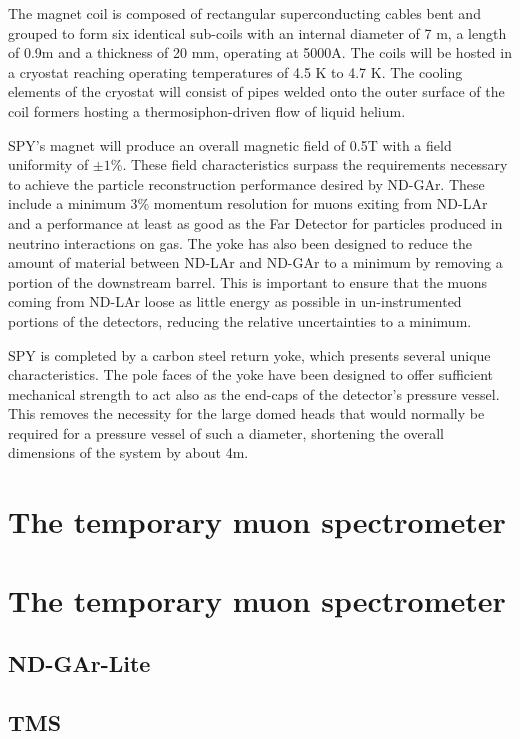 The magnet coil is composed of rectangular superconducting cables bent and grouped to form six identical sub-coils with an internal diameter of 7 m, a length of 0.9m and a thickness of 20 mm, operating at 5000A. The coils will be hosted in a cryostat reaching operating temperatures of 4.5 K to 4.7 K. The cooling elements of the cryostat will consist of pipes welded onto the outer surface of the coil formers hosting a thermosiphon-driven flow of liquid helium. 

SPY's magnet will produce an overall magnetic field of 0.5T with a field uniformity of $\pm 1\%$. These field characteristics surpass the requirements necessary to achieve the particle reconstruction performance desired by ND-GAr. These include a minimum 3\% momentum resolution for muons exiting from ND-LAr and a performance at least as good as the Far Detector for particles produced in neutrino interactions on gas. The yoke has also been designed to reduce the amount of material between ND-LAr and ND-GAr to a minimum by removing a portion of the downstream barrel. This is important to ensure that the muons coming from ND-LAr loose as little energy as possible in un-instrumented portions of the detectors, reducing the relative uncertainties to a minimum.

SPY is completed by a carbon steel return yoke, which presents several unique characteristics. The pole faces of the yoke have been designed to offer sufficient mechanical strength to act also as the end-caps of the detector's pressure vessel. This removes the necessity for the large domed heads that would normally be required for a pressure vessel of such a diameter, shortening the overall dimensions of the system by about 4m.

\section{The temporary muon spectrometer}
\clearpage

\section{The temporary muon spectrometer}
\subsection{ND-GAr-Lite}
\subsection{TMS}
